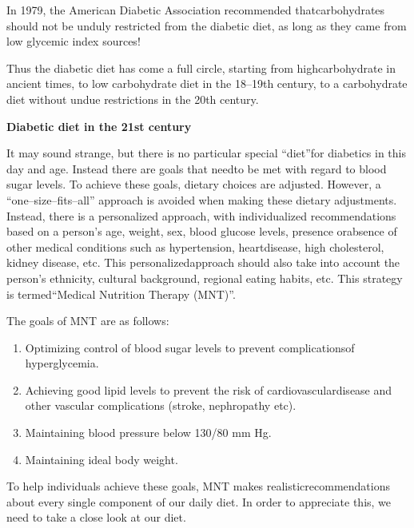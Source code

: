 In 1979, the American Diabetic Association recommended that\break carbohydrates should not be unduly restricted from the diabetic diet, as long as they came from low glycemic index sources!

Thus the diabetic diet has come a full circle, starting from high\break carbohydrate in ancient times, to low carbohydrate diet in the 18–19th century, to a carbohydrate diet without undue restrictions in the 20th century.

\noindent\textbf{Diabetic diet in the 21st century}

It may sound strange, but there is no particular special “diet”\break for diabetics in this day and age. Instead there are goals that need\break to be met with regard to blood sugar levels. To achieve these goals, dietary choices are adjusted. However, a “one–size–fits–all” approach is avoided when making these dietary adjustments. Instead, there is a persona\-lized approach, with individualized recommendations based on a person’s age, weight, sex, blood glucose levels, presence or\break absence of other medical conditions such as hypertension, heart\break disease, high cholesterol, kidney disease, etc. This personalized\break approach should also take into account the person’s ethnicity, cultural background, regional eating habits, etc. This strategy is termed\break “Medical Nutrition Therapy (MNT)”.

\clearpage

\noindent The goals of MNT are as follows:

\vspace{-\topsep}
\begin{enumerate}[•]
\itemsep=0pt
\item Optimizing control of blood sugar levels to prevent complications\break of hyperglycemia.
\item Achieving good lipid levels to prevent the risk of cardiovascular\break disease and other vascular complications (stroke, nephropathy etc).
\item Maintaining blood pressure below 130/80 mm Hg.
\item Maintaining ideal body weight.
\end{enumerate}
\vspace{-\topsep}

To help individuals achieve these goals, MNT makes realistic\break recommendations about every single component of our daily diet. In order to appreciate this, we need to take a close look at our diet.

